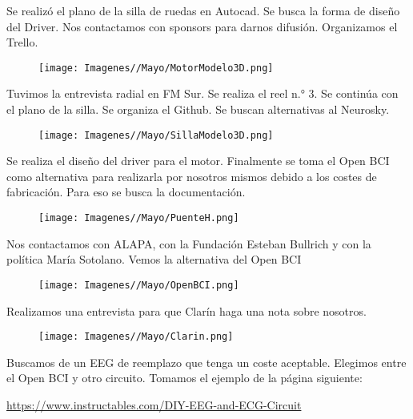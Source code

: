 \documentclass{article}
\begin{document}
Se realizó el plano de la silla de ruedas en Autocad. Se busca la forma de diseño del Driver. Nos contactamos con sponsors para darnos difusión. Organizamos el Trello.

\begin{figure}[H]
    \centering
    \texttt{[image: Imagenes//Mayo/MotorModelo3D.png]}
\end{figure}


\newpage

Tuvimos la entrevista radial en FM Sur. Se realiza el reel n.° 3. Se continúa con el plano de la silla. Se organiza el Github. Se buscan alternativas al Neurosky. 

\begin{figure}[H]
    \centering
    \texttt{[image: Imagenes//Mayo/SillaModelo3D.png]}
\end{figure}

Se realiza el diseño del driver para el motor. Finalmente se toma el Open BCI como alternativa para realizarla por nosotros mismos debido a los costes de fabricación. Para eso se busca la documentación.

\begin{figure}[H]
    \centering
    \texttt{[image: Imagenes//Mayo/PuenteH.png]}
\end{figure}

Nos contactamos con ALAPA, con la Fundación Esteban Bullrich y con la política María Sotolano. Vemos la alternativa del Open BCI

\begin{figure}[H]
    \centering
    \texttt{[image: Imagenes//Mayo/OpenBCI.png]}
\end{figure}

\newpage

Realizamos una entrevista para que Clarín haga una nota sobre nosotros.

\begin{figure}[H]
    \centering
    \texttt{[image: Imagenes//Mayo/Clarin.png]}
\end{figure}




Buscamos de un EEG de reemplazo que tenga un coste aceptable. Elegimos entre el Open BCI y otro circuito. Tomamos el ejemplo de la página siguiente: 

\begin{center}
    \href{https://www.instructables.com/DIY-EEG-and-ECG-Circuit/}{https://www.instructables.com/DIY-EEG-and-ECG-Circuit}
\end{center}
\end{document}
